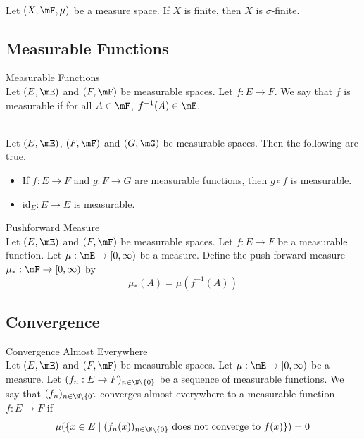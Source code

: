 \documentclass[a4paper]{article}
\begin{document}
\begin{lmm}{}{}\\
Let $(X,\mF,\mu)$ be a measure space. If $X$ is finite, then $X$ is $\sigma$-finite. 
\end{lmm}

\subsection{Measurable Functions}
\begin{defn}{Measurable Functions}{}\\
Let $(E,\mE)$ and $(F,\mF)$ be measurable spaces. Let $f:E\to F$. We say that $f$ is measurable if for all $A\in\mF$, $f^{-1}(A)\in\mE$. 
\end{defn}

\begin{lmm}{}{}\\
Let $(E,\mE)$, $(F,\mF)$ and $(G,\mG)$ be measurable spaces. Then the following are true. 
\begin{itemize}
\item If $f:E\to F$ and $g:F\to G$ are measurable functions, then $g\circ f$ is measurable. 
\item $\text{id}_E:E\to E$ is measurable. 
\end{itemize}
\end{lmm}

\begin{defn}{Pushforward Measure}{}\\
Let $(E,\mE)$ and $(F,\mF)$ be measurable spaces. Let $f:E\to F$ be a measurable function. Let $\mu:\mE\to[0,\infty)$ be a measure. Define the push forward measure $\mu_\ast:\mF\to[0,\infty)$ by $$\mu_\ast(A)=\mu(f^{-1}(A))$$
\end{defn}

\subsection{Convergence}
\begin{defn}{Convergence Almost Everywhere}{}\\
Let $(E,\mE)$ and $(F,\mF)$ be measurable spaces. Let $\mu:\mE\to[0,\infty)$ be a measure. Let $(f_n:E\to F)_{n\in\N\setminus\{0\}}$ be a sequence of measurable functions. We say that $(f_n)_{n\in\N\setminus\{0\}}$ converges almost everywhere to a measurable function $f:E\to F$ if $$\mu(\{x\in E\;|\;(f_n(x))_{n\in\N\setminus\{0\}}\text{ does not converge to }f(x)\})=0$$
\end{defn}
\end{document}
